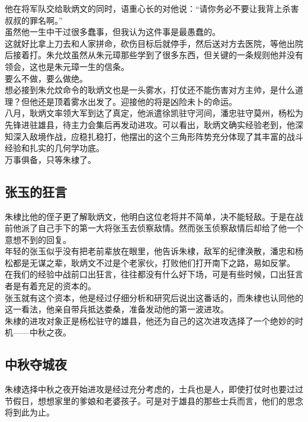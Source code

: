 \begin{multicols}{\theparacolNo}
他在将军队交给耿炳文的同时，语重心长的对他说：“请你务必不要让我背上杀害叔叔的罪名啊。”\\

虽然他一生中干过很多蠢事，但我认为这件事是最愚蠢的。\\

这就好比拿上刀去和人家拼命，砍伤目标后就停手，然后送对方去医院，等他出院后接着打。朱允炆虽然从朱元璋那些学到了很多东西，但关键的一条规则他并没有领会，这也是朱元璋一生的信条。\\

要么不做，要么做绝。\\

想必接到朱允炆命令的耿炳文也是一头雾水，打仗还不能伤害对方主帅，是什么道理？但他还是顶着雾水出发了。迎接他的将是凶险未卜的命运。\\

八月，耿炳文率领大军到达了真定，他派遣徐凯驻守河间，潘忠驻守莫州，杨松为先锋进驻雄县，待主力会集后再发动进攻。可以看出，耿炳文确实经验老到，他深知深入敌境作战，应稳扎稳打，他摆出的这个三角形阵势充分体现了其丰富的战斗经验和扎实的几何学功底。\\

万事俱备，只等朱棣了。\\

\subsection{张玉的狂言}
朱棣比他的侄子更了解耿炳文，他明白这位老将并不简单，决不能轻敌。于是在战前他派了自己手下的第一大将张玉去侦察敌情。然而张玉侦察敌情后却给了他一个意想不到的回复。\\

年轻的张玉似乎没有把老前辈放在眼里，他告诉朱棣，敌军的纪律涣散，潘忠和杨松都是无谋之辈，耿炳文不过是个老家伙，打败他们打开南下之路，易如反掌。\\

在我们的经验中战前口出狂言，往往都没有什么好下场，可是有些时候，口出狂言者是有着充足的资本的。\\

张玉就有这个资本，他是经过仔细分析和研究后说出这番话的，而朱棣也认同他的这一看法，他亲自带兵抵达娄桑，准备发动他的第一波进攻。\\

朱棣的进攻对象正是杨松驻守的雄县，他还为自己的这次进攻选择了一个绝妙的时机——中秋之夜。\\

\subsection{中秋夺城夜}
朱棣选择中秋之夜开始进攻是经过充分考虑的，士兵也是人，即使打仗时也要过过节假日，想想家里的爹娘和老婆孩子。可是对于雄县的那些士兵而言，他们的思念将到此为止。\\


\end{multicols}
